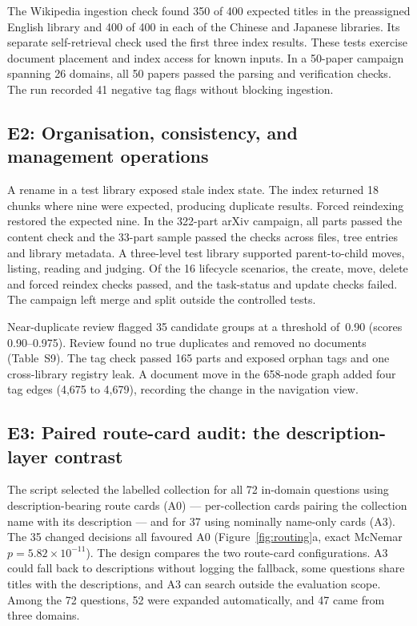 The Wikipedia ingestion check found 350 of 400 expected titles in the
preassigned English library and 400 of 400 in each of the Chinese and
Japanese libraries. Its separate self-retrieval check used the first
three index results. These tests exercise document placement and
index access for known inputs. In a 50-paper campaign spanning 26
domains, all 50 papers passed the parsing and verification checks.
The run recorded 41 negative tag flags without blocking ingestion.

\subsection{E2: Organisation, consistency, and management operations}
\label{sec:e2}
A rename in a test library exposed stale index state. The index returned
18 chunks where nine were expected, producing duplicate results. Forced
reindexing restored the expected nine. In the 322-part arXiv campaign,
all parts passed the content check and the 33-part sample passed the
checks across files, tree entries and library metadata. A three-level
test library supported parent-to-child moves, listing, reading and
judging. Of the 16 lifecycle scenarios, the create, move, delete and
forced reindex checks passed, and the task-status and update checks
failed. The campaign left merge and split outside the controlled tests.

Near-duplicate review flagged 35 candidate groups at a threshold of~0.90
(scores 0.90--0.975). Review found no true duplicates and removed no
documents (Table~S9). The tag check passed 165 parts and exposed orphan
tags and one cross-library registry leak. A document move in the 658-node
graph added four tag edges (4,675 to 4,679), recording the change in the
navigation view.

\subsection{E3: Paired route-card audit: the description-layer contrast}
\label{sec:routing-audit}
The script selected the labelled collection for all 72 in-domain
questions using description-bearing route cards (A0) --- per-collection
cards pairing the collection name with its description --- and for 37
using nominally name-only cards (A3). The 35 changed decisions all favoured A0
(Figure~\ref{fig:routing}a, exact McNemar $p=5.82\times10^{-11}$). The
design compares the two route-card configurations. A3 could fall back
to descriptions without logging the fallback, some questions share
titles with the descriptions, and A3 can search outside the evaluation
scope. Among the 72 questions, 52 were expanded automatically, and
47 came from three domains.

